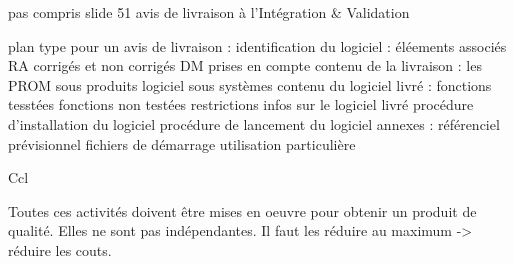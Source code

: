 pas compris slide 51
avis de livraison à l’Intégration & Validation

plan type pour un avis de livraison :
identification du logiciel :
éléements associés
RA corrigés et non corrigés
DM prises en compte
contenu de la livraison :
les PROM
sous produits logiciel
sous systèmes
contenu du logiciel livré :
fonctions tesstées
fonctions non testées
restrictions
infos sur le logiciel livré
procédure d’installation du logiciel
procédure de lancement du logiciel
annexes :
référenciel prévisionnel
fichiers de démarrage
utilisation particulière

Ccl

Toutes ces activités doivent être mises en oeuvre pour obtenir un produit de qualité. Elles ne sont pas indépendantes. Il faut les réduire au maximum -> réduire les couts.
